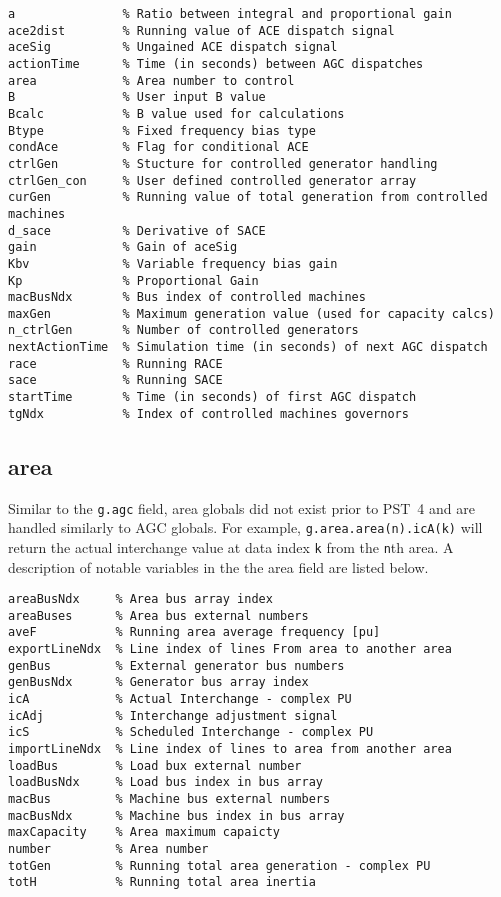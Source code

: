 \begin{verbatim}
a               % Ratio between integral and proportional gain
ace2dist        % Running value of ACE dispatch signal
aceSig          % Ungained ACE dispatch signal
actionTime      % Time (in seconds) between AGC dispatches
area            % Area number to control
B               % User input B value
Bcalc           % B value used for calculations
Btype           % Fixed frequency bias type
condAce         % Flag for conditional ACE
ctrlGen         % Stucture for controlled generator handling
ctrlGen_con     % User defined controlled generator array
curGen          % Running value of total generation from controlled machines
d_sace          % Derivative of SACE
gain            % Gain of aceSig
Kbv             % Variable frequency bias gain
Kp              % Proportional Gain
macBusNdx       % Bus index of controlled machines
maxGen          % Maximum generation value (used for capacity calcs)
n_ctrlGen       % Number of controlled generators
nextActionTime  % Simulation time (in seconds) of next AGC dispatch
race            % Running RACE
sace            % Running SACE
startTime       % Time (in seconds) of first AGC dispatch
tgNdx           % Index of controlled machines governors
\end{verbatim}

\subsection{area} \label{ss: area globals} 
Similar to the \verb|g.agc| field, area globals did not exist prior to \mbox{PST 4} and are handled similarly to AGC globals.
For example, \verb|g.area.area(n).icA(k)| will return the actual interchange value at data index \verb|k| from the \verb|n|th area.
A description of notable variables in the the area field are listed below.
\begin{verbatim}
areaBusNdx     % Area bus array index
areaBuses      % Area bus external numbers
aveF           % Running area average frequency [pu]
exportLineNdx  % Line index of lines From area to another area
genBus         % External generator bus numbers
genBusNdx      % Generator bus array index
icA            % Actual Interchange - complex PU
icAdj          % Interchange adjustment signal
icS            % Scheduled Interchange - complex PU
importLineNdx  % Line index of lines to area from another area
loadBus        % Load bux external number
loadBusNdx     % Load bus index in bus array
macBus         % Machine bus external numbers
macBusNdx      % Machine bus index in bus array
maxCapacity    % Area maximum capaicty
number         % Area number
totGen         % Running total area generation - complex PU
totH           % Running total area inertia
\end{verbatim}

